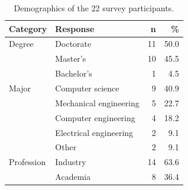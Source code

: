 \begin{table}[h]
    \centering
    \caption{Demographics of the 22 survey participants.}
    \label{tab:survey-demographics}
    \small
    \begin{tabularx}{\columnwidth}{@{}l X rr@{}}
        \toprule
        \textbf{Category} & \textbf{Response} & \textbf{n} & \textbf{\%} \\
        \midrule
        Degree & Doctorate & 11 & 50.0 \\
            & Master's & 10 & 45.5 \\
            & Bachelor's & 1 & 4.5 \\
        \midrule
        Major & Computer science & 9 & 40.9 \\
            & Mechanical engineering & 5 & 22.7 \\
            & Computer engineering & 4 & 18.2 \\
            & Electrical engineering & 2 & 9.1 \\
            & Other & 2 & 9.1 \\
        \midrule
        Profession & Industry & 14 & 63.6 \\
            & Academia & 8 & 36.4 \\
        \bottomrule
    \end{tabularx}
\end{table}
